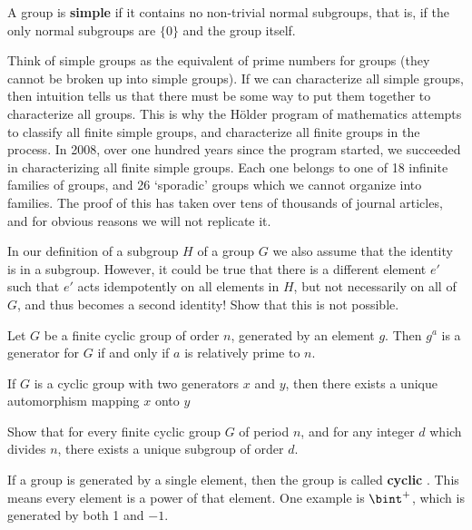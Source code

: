 \begin{definition}
    A group is {\bf simple}  if it contains no non-trivial normal subgroups, that is, if the only normal subgroups are $\{ 0 \}$ and the group itself.
\end{definition}

Think of simple groups as the equivalent of prime numbers for groups (they cannot be broken up into simple groups). If we can characterize all simple groups, then intuition tells us that there must be some way to put them together to characterize all groups. This is why the H\"{o}lder program of mathematics attempts to classify all finite simple groups, and characterize all finite groups in the process. In 2008, over one hundred years since the program started, we succeeded in characterizing all finite simple groups. Each one belongs to one of 18 infinite families of groups, and 26 `sporadic' groups which we cannot organize into families. The proof of this has taken over tens of thousands of journal articles, and for obvious reasons we will not replicate it.

\clearpage

\begin{exercise}
    In our definition of a subgroup $H$ of a group $G$ we also assume that the identity is in a subgroup. However, it could be true that there is a different element $e'$ such that $e'$ acts idempotently on all elements in $H$, but not necessarily on all of $G$, and thus becomes a second identity! Show that this is not possible.
\end{exercise}

\begin{exercise}
    Let $G$ be a finite cyclic group of order $n$, generated by an element $g$. Then $g^a$ is a generator for $G$ if and only if $a$ is relatively prime to $n$.
\end{exercise}

\begin{exercise}
    If $G$ is a cyclic group with two generators $x$ and $y$, then there exists a unique automorphism mapping $x$ onto $y$
\end{exercise}

\begin{exercise}
    Show that for every finite cyclic group $G$ of period $n$, and for any integer $d$ which divides $n$, there exists a unique subgroup of order $d$.
\end{exercise}


\begin{definition}
    If a group is generated by a single element, then the group is called {\bf cyclic} . This means every element is a power of that element. One example is $\bint^+$, which is generated by both 1 and $-1$.
\end{definition}

